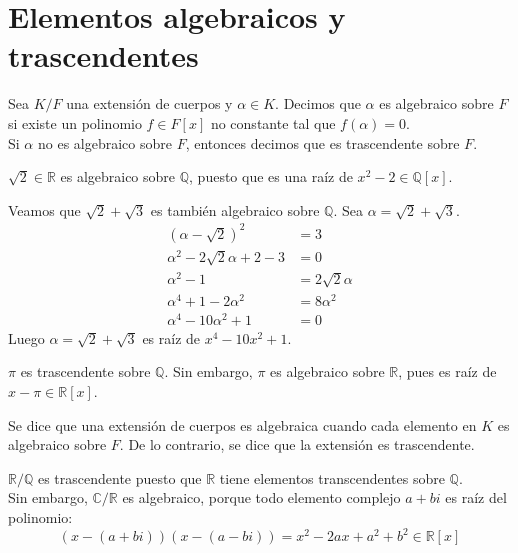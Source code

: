 \section{Elementos algebraicos y trascendentes}

\begin{definition}
    Sea $K/F$ una extensión de cuerpos y $\alpha \in K$. Decimos que $\alpha$ es algebraico sobre $F$ si existe un polinomio $f \in F[x]$ no constante tal que $f(\alpha) = 0$.\\
    Si $\alpha$ no es algebraico sobre $F$, entonces decimos que es trascendente sobre $F$.
\end{definition}

\begin{example}
    $\sqrt{2} \in \mathbb{R}$ es algebraico sobre $\mathbb{Q}$, puesto que es una raíz de $x^2 - 2 \in \mathbb{Q}[x]$.
\end{example}

\begin{example}
    Veamos que $\sqrt{2} + \sqrt{3}$ es también algebraico sobre $\mathbb{Q}$. Sea $\alpha = \sqrt{2} + \sqrt{3}$.
    \begin{align*}
        (\alpha - \sqrt{2})^2              & = 3               \\
        \alpha^2 - 2\sqrt{2}\alpha + 2 - 3 & = 0               \\
        \alpha^2 - 1                       & = 2\sqrt{2}\alpha \\
        \alpha^4 + 1 - 2\alpha^2           & = 8\alpha^2       \\
        \alpha^4 - 10\alpha^2 + 1          & = 0
    \end{align*}
    Luego $\alpha = \sqrt{2} + \sqrt{3}$ es raíz de $x^4 - 10x^2 + 1$.
\end{example}

\begin{example}
    $\pi$ es trascendente sobre $\mathbb{Q}$. Sin embargo, $\pi$ es algebraico sobre $\mathbb{R}$, pues es raíz de $x - \pi \in \mathbb{R}[x]$.
\end{example}

\begin{definition}
    Se dice que una extensión de cuerpos es algebraica cuando cada elemento en $K$ es algebraico sobre $F$.
    De lo contrario, se dice que la extensión es trascendente.
\end{definition}

\begin{example}
    $\mathbb{R}/\mathbb{Q}$ es trascendente puesto que $\mathbb{R}$ tiene elementos transcendentes sobre $\mathbb{Q}$.\\
    Sin embargo, $\mathbb{C}/\mathbb{R}$ es algebraico, porque todo elemento complejo $a + bi$ es raíz del polinomio:
    $$(x - (a+bi))(x - (a-bi)) = x^2 - 2ax + a^2 + b^2 \in \mathbb{R}[x]$$
\end{example}

